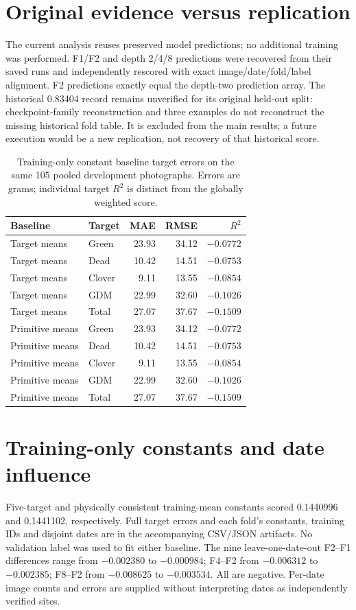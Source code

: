 \documentclass[pdflatex,a4paper,sn-nature]{sn-jnl}
\begin{document}
\section*{Original evidence versus replication}
The current analysis reuses preserved model predictions; no additional training was performed. F1/F2 and depth 2/4/8 predictions were recovered from their saved runs and independently rescored with exact image/date/fold/label alignment. F2 predictions exactly equal the depth-two prediction array. The historical 0.83404 record remains unverified for its original held-out split: checkpoint-family reconstruction and three examples do not reconstruct the missing historical fold table. It is excluded from the main results; a future execution would be a new replication, not recovery of that historical score.
\begin{table}[!htbp]
\centering\caption{Training-only constant baseline target errors on the same 105 pooled development photographs. Errors are grams; individual target $R^2$ is distinct from the globally weighted score.}
\begin{tabular}{llrrr}\toprule Baseline & Target & MAE & RMSE & $R^2$ \\
\midrule
Target means & Green & 23.93 & 34.12 & $-0.0772$ \\
Target means & Dead & 10.42 & 14.51 & $-0.0753$ \\
Target means & Clover & 9.11 & 13.55 & $-0.0854$ \\
Target means & GDM & 22.99 & 32.60 & $-0.1026$ \\
Target means & Total & 27.07 & 37.67 & $-0.1509$ \\
Primitive means & Green & 23.93 & 34.12 & $-0.0772$ \\
Primitive means & Dead & 10.42 & 14.51 & $-0.0753$ \\
Primitive means & Clover & 9.11 & 13.55 & $-0.0854$ \\
Primitive means & GDM & 22.99 & 32.60 & $-0.1026$ \\
Primitive means & Total & 27.07 & 37.67 & $-0.1509$ \\
\bottomrule\end{tabular}
\label{tab:s2}
\end{table}
\section*{Training-only constants and date influence}
Five-target and physically consistent training-mean constants scored 0.1440996 and 0.1441102, respectively. Full target errors and each fold's constants, training IDs and disjoint dates are in the accompanying CSV/JSON artifacts. No validation label was used to fit either baseline. The nine leave-one-date-out F2--F1 differences range from $-0.002380$ to $-0.000984$; F4--F2 from $-0.006312$ to $-0.002385$; F8--F2 from $-0.008625$ to $-0.003534$. All are negative. Per-date image counts and errors are supplied without interpreting dates as independently verified sites.
\end{document}
